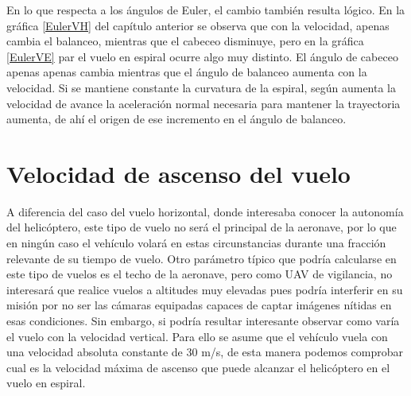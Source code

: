 En lo que respecta a los ángulos de Euler, el cambio también resulta lógico. En la gráfica \ref{EulerVH} del capítulo anterior se observa que con la velocidad, apenas cambia el balanceo, mientras que el cabeceo disminuye, pero en la gráfica \ref{EulerVE} par el vuelo en espiral ocurre algo muy distinto.
El ángulo de cabeceo apenas apenas cambia mientras que el ángulo de balanceo aumenta con la velocidad. Si se mantiene constante la curvatura de la espiral, según aumenta la velocidad de avance la aceleración normal necesaria para mantener la trayectoria aumenta, de ahí el origen de ese incremento en el ángulo de balanceo.

\section{Velocidad de ascenso del vuelo}

A diferencia del caso del vuelo horizontal, donde interesaba conocer la autonomía del helicóptero, este tipo de vuelo no será el principal de la aeronave, por lo que en ningún caso el vehículo volará en estas circunstancias durante una fracción relevante de su tiempo de vuelo. Otro parámetro típico que podría calcularse en este tipo de vuelos es el techo de la aeronave, pero como UAV de vigilancia, no interesará que realice vuelos a altitudes muy elevadas pues podría interferir en su misión por no ser las cámaras equipadas capaces de captar imágenes nítidas en esas condiciones.
Sin embargo, si podría resultar interesante observar como varía el vuelo con la velocidad vertical. Para ello se asume que el vehículo vuela con una velocidad absoluta constante de 30 m/s, de esta manera podemos comprobar cual es la velocidad máxima de ascenso que puede alcanzar el helicóptero en el vuelo en espiral.

